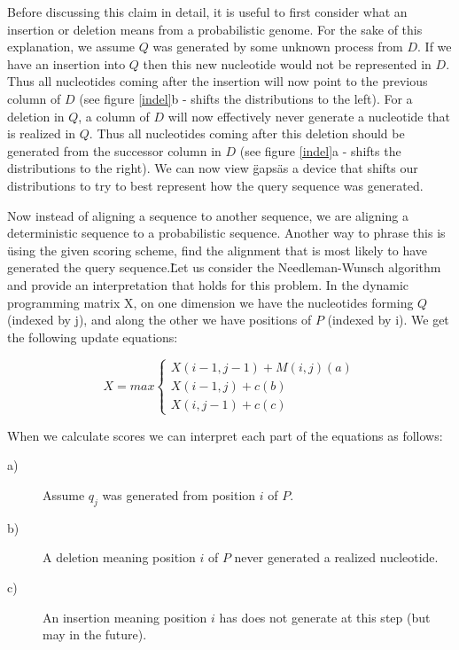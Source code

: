 \documentclass[11pt]{IEEEtran}
\begin{document}
Before discussing this claim in detail, it is useful to first consider what an insertion or deletion means from a probabilistic genome. For the sake of this explanation, we assume $Q$ was generated by some unknown process from $D$. If we have an insertion into $Q$ then this new nucleotide would not be represented in $D$. Thus all nucleotides coming after the insertion will now point to the previous column of $D$ (see figure \ref{indel}b - shifts the distributions to the left). For a deletion in $Q$, a column of $D$ will now effectively never generate a nucleotide that is realized in $Q$. Thus all nucleotides coming after this deletion should be generated from the successor column in $D$ (see figure \ref{indel}a - shifts the distributions to the right). We can now view \"gaps\" as a device that shifts our distributions to try to best represent how the query sequence was generated.

Now instead of aligning a sequence to another sequence, we are aligning a deterministic sequence to a probabilistic sequence. Another way to phrase this is \"using the given scoring scheme, find the alignment that is most likely to have generated the query sequence.\" Let us consider the Needleman-Wunsch algorithm and provide an interpretation that holds for this problem. In the dynamic programming matrix X, on one dimension we have the nucleotides forming $Q$ (indexed by j), and along the other we have positions of $P$ (indexed by i). We get the following update equations:

\begin{equation}
X = max
\begin{cases}
X(i-1,j-1) + M(i,j) (a)\\
X(i-1, j) + c (b)\\
X(i, j-1) + c (c)
\end{cases}
\end{equation}

When we calculate scores we can interpret each part of the equations as follows:

\begin{description}
  \item[a)] Assume $q_j$ was generated from position $i$ of $P$.
  \item[b)] A deletion meaning position $i$ of $P$ never generated a realized nucleotide.
  \item[c)] An insertion meaning position $i$ has does not generate at this step (but may in the future).
\end{description}
\end{document}
